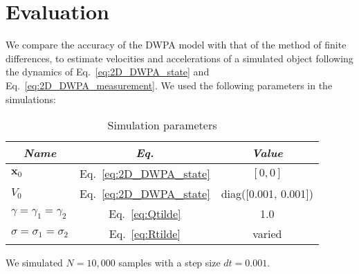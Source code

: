 \documentclass[fleqn,12pt]{article}
\begin{document}
\section{Evaluation}

We compare the accuracy of the DWPA model with that of the method of finite
differences, to estimate velocities and accelerations of a simulated object
following the dynamics of
Eq.~\ref{eq:2D_DWPA_state} and Eq.~\ref{eq:2D_DWPA_measurement}. We used the
following parameters in the simulations:

\begin{table}[h!]
    \centering
    \begin{tabular}{|l|c|c|}\hline
        \multicolumn{1}{|c|}{\emph{Name}} & \multicolumn{1}{|c|}{\emph{Eq.}} & \multicolumn{1}{|c|}{\emph{Value}} \\\hline\hline
        $\mathbf{x}_0$                        & Eq.~\ref{eq:2D_DWPA_state} & $[0, 0]$\\\hline
        $V_0$                                 & Eq.~\ref{eq:2D_DWPA_state} & diag([0.001, 0.001])\\\hline
        $\gamma=\gamma_1=\gamma_2$            & Eq.~\ref{eq:Qtilde} & 1.0\\\hline
        $\sigma=\sigma_1=\sigma_2$            & Eq.~\ref{eq:Rtilde} & varied\\\hline
    \end{tabular}
    \caption{Simulation parameters}
\end{table}

\noindent We simulated $N=10,000$ samples with a step size $dt=0.001$.



\end{document}
